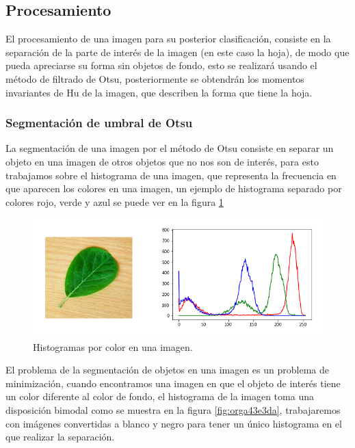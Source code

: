 \documentclass[letter]{article}
\begin{document}
\subsection{Procesamiento}
\label{sec:org1d2d80c}
El procesamiento de una imagen para su posterior clasificación, consiste en la
separación de la parte de interés de la imagen (en este caso la hoja), de modo
que pueda apreciarse su forma sin objetos de fondo, esto se realizará usando el
método de filtrado de Otsu, posteriormente se obtendrán los momentos invariantes
de Hu de la imagen, que describen la forma que tiene la hoja.

\subsubsection{Segmentación de umbral de Otsu}
\label{sec:org19a2c9e}
La segmentación de una imagen por el método de Otsu consiste en separar un
objeto en una imagen de otros objetos que no nos son de interés, para esto
trabajamos sobre el histograma de una imagen, que representa la frecuencia en
que aparecen los colores en una imagen, un ejemplo de histograma separado por
colores rojo, verde y azul se puede ver en la figura \ref{fig:org21a54cd}

\begin{figure}[htbp]
\centering
\includegraphics[width=.9\linewidth]{./images/histogram1.png}
\caption{\label{fig:org21a54cd}Histogramas por color en una imagen.}
\end{figure}

El problema de la segmentación de objetos en una imagen es un problema de
minimización, cuando encontramos una imagen en que el objeto de interés tiene un
color diferente al color de fondo, el histograma de la imagen toma una
disposición bimodal como se muestra en la figura \ref{fig:orga43e3da}, trabajaremos con
imágenes convertidas a blanco y negro para tener un único histograma en el que
realizar la separación.
\end{document}
